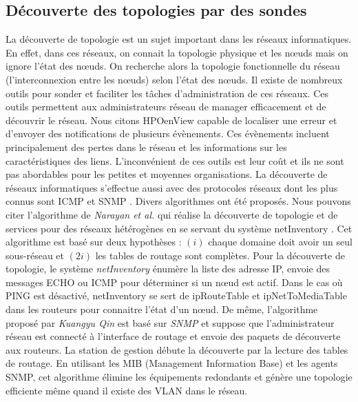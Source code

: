 \subsection{D\'ecouverte des topologies par des sondes}
La d\'ecouverte de topologie est un sujet important dans les r\'eseaux informatiques.
En effet, dans ces r\'eseaux,  on connait la topologie physique et les n\oe uds mais on ignore l'\'etat des n\oe uds. On recherche alors la topologie fonctionnelle du r\'eseau (l'interconnexion entre les n\oe uds) selon l'\'etat des n\oe uds. 
Il existe de nombreux outils pour sonder et faciliter les t\^aches d'administration de ces r\'eseaux. 
Ces outils permettent aux administrateurs r\'eseau de manager efficacement et de d\'ecouvrir le r\'eseau.
Nous citons HPOenView \cite{OpenView} capable de localiser une erreur et d'envoyer des notifications de plusieurs \'ev\`enements. Ces \'ev\`enements incluent principalement des pertes dans le r\'eseau et les informations sur les caract\'eristiques des liens.
L'inconv\'enient de ces outils est leur co\^ut et ils ne sont pas abordables pour les petites et moyennes organisations.
La d\'ecouverte de r\'eseaux informatiques s'effectue  aussi avec des protocoles r\'eseaux dont les plus connus sont ICMP \cite{rfc792} et SNMP \cite{rfc2821}.
Divers algorithmes ont \'et\'e propos\'es. 
Nous pouvons citer l'algorithme de {\em Narayan et al.} \cite{Breitbart:2004:TDH:1008463.1008464} qui r\'ealise la d\'ecouverte de topologie et de services pour des r\'eseaux h\'et\'erog\`enes en se servant du syst\`eme netInventory \cite{breitbart2004topology}. 
Cet algorithme est bas\'e sur deux hypoth\`eses : 
$(i)$ chaque domaine doit avoir un seul sous-r\'eseau et 
$(2i)$ les tables de routage sont compl\`etes. 
Pour la d\'ecouverte de topologie, le syst\`eme {\em netInventory} \'enum\`ere la liste des adresse IP, envoie des messages ECHO ou ICMP pour d\'eterminer si un n\oe ud est actif. Dans le cas o\`u PING est d\'esactiv\'e, netInventory se sert de ipRouteTable et ipNetToMediaTable dans les routeurs pour connaitre l'\'etat d'un n\oe ud.
\newline
De m\^eme, l'algorithme propos\'e par {\em Kuangyu Qin} \cite{QinKuangyuChunquan2010} est bas\'e sur {\em SNMP} et suppose que l'administrateur r\'eseau est connect\'e \`a l'interface de routage et envoie des paquets de d\'ecouverte aux routeurs. La station de gestion d\'ebute la d\'ecouverte par la lecture des tables de routage. En utilisant les MIB (Management Information Base) et les agents SNMP, cet algorithme \'elimine les \'equipements redondants et g\'en\`ere une topologie efficiente m\^eme quand il existe des VLAN dans le r\'eseau.
